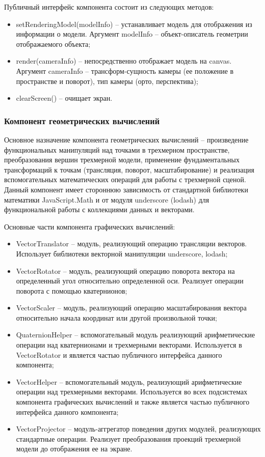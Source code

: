 Публичный интерфейс компонента состоит из следующих методов:
\begin{itemize}
\item setRenderingModel(modelInfo) -- устанавливает модель для отображения из информации о модели. Аргумент modelInfo -- объект-описатель геометрии отображаемого объекта;
\item render(cameraInfo) -- непосредственно отображает модель на canvas. Аргумент cameraInfo -- трансформ-сущность камеры (ее положение в пространстве и поворот), тип камеры (орто, перспектива);
\item clearScreen() -- очищает экран.
\end{itemize}

\subsubsection{Компонент геометрических вычислений}
\label{sub:theory:components:calculation}

Основное назначение компонента геометрических вычислений -- произведение функциональных манипуляций над точками в трехмерном пространстве, преобразования вершин трехмерной модели, применение
фундаментальных трансформаций к точкам (трансляция, поворот, масштабирование) и реализация вспомогательных математических операций для работы с трехмерной сценой. Данный компонент имеет стороннюю
зависимость от стандартной библиотеки математики JavaScript.Math и от модуля underscore (lodash) для функциональной работы с коллекциями данных и векторами.

Основные части компонента графических вычислений:

\begin{itemize}
\item VectorTranslator -- модуль, реализующий операцию трансляции векторов. Использует библиотеки векторной манипуляции underscore, lodash;
\item VectorRotator -- модуль, реализующий операцию поворота вектора на определенный угол относительно определенной оси. Реализует операции поворота с помощью кватернионов;
\item VectorScaler -- модуль, реализующий операцию масштабирования вектора относительно начала координат или другой произвольной точки;
\item QuaternionHelper -- вспомогательный модуль реализующий арифметические операции над кватернионами и трехмерными векторами. Используется в VectorRotator и является частью публичного интерфейса
данного компонента;
\item VectorHelper -- вспомогательный модуль, реализующий арифметические операции над трехмерными векторами. Используется во всех подсистемах компонента графических вычислений и также является частью 
публичного интерфейса данного компонента;
\item VectorProjector -- модуль-аггрегатор поведения других модулей, реализующих стандартные операции. Реализует преобразования проекций трехмерной модели до отображения ее на экране.
\end{itemize}

